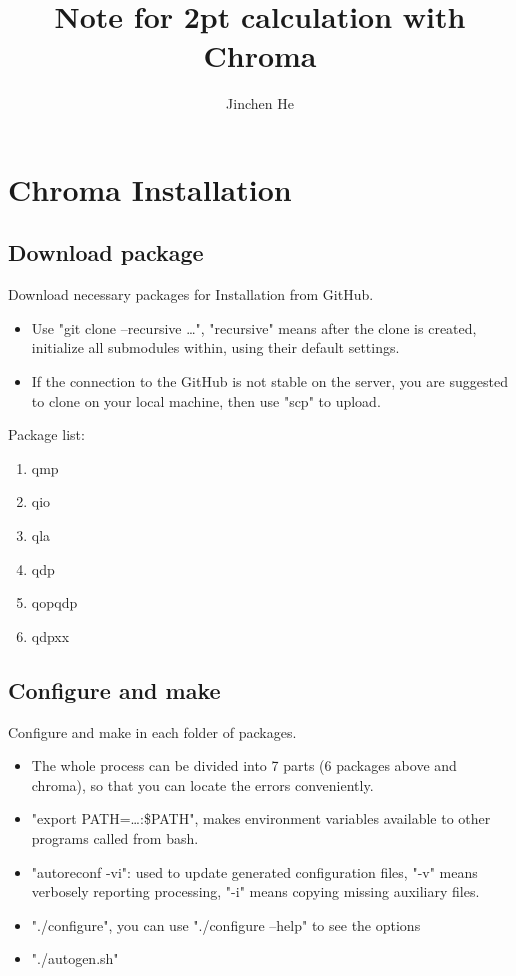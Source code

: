 \documentclass{article}
\title{Note for 2pt calculation with Chroma}
\author{Jinchen He}
\date{}
\begin{document}
\maketitle
\section{Chroma Installation}

\subsection{Download package}

Download necessary packages for Installation from GitHub.

\begin{itemize}
    \item Use "git clone --recursive \dots", "recursive" means after the clone is created, initialize all submodules within, using their default settings.
    \item If the connection to the GitHub is not stable on the server, you are suggested to clone on your local machine, then use "scp" to upload.
\end{itemize}

Package list:

\begin{enumerate}
    \item qmp
    \item qio
    \item qla
    \item qdp
    \item qopqdp
    \item qdpxx
\end{enumerate}

\subsection{Configure and make}

Configure and make in each folder of packages.

\begin{itemize}
    \item The whole process can be divided into 7 parts (6 packages above and chroma), so that you can locate the errors conveniently.
    \item "export PATH=\dots:\$PATH", makes environment variables available to other programs called from bash. 
    \item "autoreconf -vi": used to update generated configuration files, "-v" means verbosely reporting processing, "-i" means copying missing auxiliary files.
    \item "./configure", you can use "./configure –help" to see the options
    \item "./autogen.sh"
\end{itemize}
\end{document}
